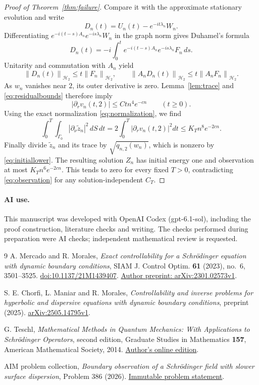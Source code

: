 \documentclass[11pt]{article}
\newcommand{\HH}{\mathcal H}
\newcommand{\norm}[1]{\left\|#1\right\|}
\begin{document}
\begin{proof}[Proof of Theorem~\ref{thm:failure}]
Compare it with the approximate stationary evolution and write
\[
D_n(t)=U_n(t)-e^{-it\lambda_n}W_n.
\]
Differentiating
\(e^{-i(t-s)A_n}e^{-is\lambda_n}W_n\) in the graph norm gives Duhamel's
formula
\[
D_n(t)=-i\int_0^t e^{-i(t-s)A_n}e^{-is\lambda_n}F_n\,ds.
\]
Unitarity and commutation with \(A_n\) yield
\[
\norm{D_n(t)}_{\HH_2}\le t\norm{F_n}_{\HH_2},\qquad
\norm{A_nD_n(t)}_{\HH_2}\le t\norm{A_nF_n}_{\HH_2}.
\]
As \(w_n\) vanishes near \(2\), its outer derivative is zero.
Lemma~\ref{lem:trace} and \eqref{eq:residualbounds} therefore imply
\[
|\partial_r v_n(t,2)|\le Ct n^4e^{-cn}\qquad(t\ge0).
\]
Using the exact normalization \eqref{eq:normalization}, we find
\[
\int_0^T\int_{\Gamma_0}|\partial_\nu\widetilde z_n|^2\,dS\,dt
=2\int_0^T|\partial_r v_n(t,2)|^2dt
\le K_T n^8e^{-2cn}.
\]
Finally divide \(\widetilde z_n\) and its trace by
\(\sqrt{q_{n,2}(w_n)}\), which is nonzero by \eqref{eq:initiallower}.
The resulting solution \(Z_n\) has initial energy one and observation at
most \(K_T n^6e^{-2cn}\). This tends to zero for every fixed \(T>0\),
contradicting \eqref{eq:observation} for any solution-independent \(C_T\).
\end{proof}

\paragraph{AI use.}
This manuscript was developed with OpenAI Codex (gpt-6.1-sol), including
the proof construction, literature checks and writing. The checks performed
during preparation were AI checks; independent mathematical review is
requested.

\begin{thebibliography}{9}
A. Mercado and R. Morales,
\emph{Exact controllability for a Schr\"odinger equation with dynamic
boundary conditions},
SIAM J. Control Optim. \textbf{61} (2023), no.~6, 3501--3525.
\href{https://doi.org/10.1137/21M1439407}{doi:10.1137/21M1439407}.
\href{https://arxiv.org/abs/2301.02573v1}{Author preprint: arXiv:2301.02573v1}.

S. E. Chorfi, L. Maniar and R. Morales,
\emph{Controllability and inverse problems for hyperbolic and dispersive
equations with dynamic boundary conditions},
preprint (2025).
\href{https://arxiv.org/abs/2505.14795v1}{arXiv:2505.14795v1}.

G. Teschl,
\emph{Mathematical Methods in Quantum Mechanics: With Applications to
Schr\"odinger Operators}, second edition,
Graduate Studies in Mathematics \textbf{157},
American Mathematical Society, 2014.
\href{https://www.mat.univie.ac.at/~gerald/ftp/book-schroe/schroe2.pdf}{Author's online edition}.

AIM problem collection,
\emph{Boundary observation of a Schr\"odinger field with slower surface
dispersion}, Problem 386 (2026).
\href{https://github.com/MColbrook/AIM/blob/c9929805cece044705abaaebe1cebddac1ba11a6/problems/386-slow-surface-schrodinger-observability.md}{Immutable problem statement}.
\end{thebibliography}
\end{document}
